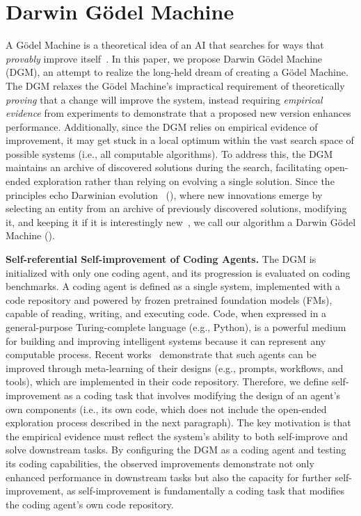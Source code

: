 \section{Darwin G\"odel Machine}
\label{sec:methods}

A G\"odel Machine is a theoretical idea of an AI that searches for ways that \emph{provably} improve itself~\citep{schmidhuber2007godel}. In this paper, we propose Darwin G\"odel Machine (DGM), an attempt to realize the long-held dream of creating a G\"odel Machine. The DGM relaxes the G\"odel Machine's impractical requirement of theoretically \emph{proving} that a change will improve the system, instead requiring \emph{empirical evidence} from experiments to demonstrate that a proposed new version enhances performance. Additionally, since the DGM relies on empirical evidence of improvement, it may get stuck in a local optimum within the vast search space of possible systems (i.e., all computable algorithms). To address this, the DGM maintains an archive of discovered solutions during the search, facilitating open-ended exploration rather than relying on evolving a single solution. Since the principles echo Darwinian evolution~\citep{darwin2023origin} (), where new innovations emerge by selecting an entity from an archive of previously discovered solutions, modifying it, and keeping it if it is interestingly new~\citep{zhang2024omni, faldor2025omni, stanley2015greatness}, we call our algorithm a Darwin G\"odel Machine ().

\textbf{Self-referential Self-improvement of Coding Agents.}
The DGM is initialized with only one coding agent, and its progression is evaluated on coding benchmarks. A coding agent is defined as a single system, implemented with a code repository and powered by frozen pretrained foundation models (FMs), capable of reading, writing, and executing code. Code, when expressed in a general-purpose Turing-complete language (e.g., Python), is a powerful medium for building and improving intelligent systems because it can represent any computable process. Recent works~\citep{hu2025automated, zhang2024aflow} demonstrate that such agents can be improved through meta-learning of their designs (e.g., prompts, workflows, and tools), which are implemented in their code repository. Therefore, we define self-improvement as a coding task that involves modifying the design of an agent's own components (i.e., its own code, which does not include the open-ended exploration process described in the next paragraph). The key motivation is that the empirical evidence must reflect the system's ability to both self-improve and solve downstream tasks. By configuring the DGM as a coding agent and testing its coding capabilities, the observed improvements demonstrate not only enhanced performance in downstream tasks but also the capacity for further self-improvement, as self-improvement is fundamentally a coding task that modifies the coding agent's own code repository.

